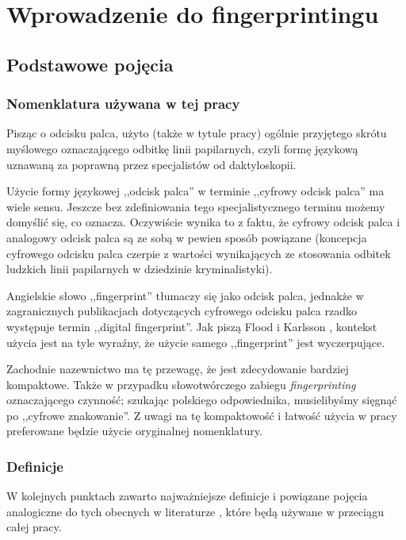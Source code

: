 \chapter{Wprowadzenie do fingerprintingu}

\section{Podstawowe pojęcia}

\subsection{Nomenklatura używana w tej pracy}
Pisząc o odcisku palca, użyto (także w tytule pracy) ogólnie przyjętego skrótu
myślowego oznaczającego odbitkę linii papilarnych, czyli formę językową uznawaną
za poprawną przez specjalistów od daktyloskopii.

Użycie formy językowej ,,odcisk palca'' w terminie ,,cyfrowy odcisk palca'' ma
wiele sensu. Jeszcze bez zdefiniowania tego specjalistycznego terminu możemy
domyślić się, co oznacza. Oczywiście wynika to z faktu, że cyfrowy odcisk palca
i analogowy odcisk palca są ze sobą w pewien sposób powiązane (koncepcja
cyfrowego odcisku palca czerpie z wartości wynikających ze stosowania odbitek
ludzkich linii papilarnych w dziedzinie kryminalistyki).

Angielskie słowo ,,fingerprint'' tłumaczy się jako odcisk palca, jednakże w
zagranicznych publikacjach dotyczących cyfrowego odcisku palca rzadko występuje
termin ,,digital fingerprint''. Jak piszą Flood i Karlsson
\cite[s. 4]{flood2012browser}, kontekst użycia jest na tyle wyraźny, że użycie
samego ,,fingerprint'' jest wyczerpujące.

Zachodnie nazewnictwo ma tę przewagę, że jest zdecydowanie bardziej kompaktowe.
Także w przypadku słowotwórczego zabiegu \emph{fingerprinting} oznaczającego
czynność; szukając polskiego odpowiednika, musielibyśmy sięgnąć po ,,cyfrowe
znakowanie''. Z uwagi na tę kompaktowość i łatwość użycia w pracy preferowane
będzie użycie oryginalnej nomenklatury.

\subsection{Definicje}
W kolejnych punktach zawarto najważniejsze definicje i powiązane pojęcia
analogiczne do tych obecnych w literaturze
\cite{eckersley2010unique,flood2012browser}, które będą używane w przeciągu
całej pracy.

